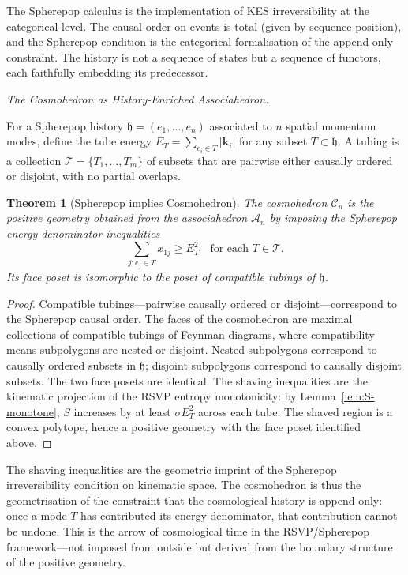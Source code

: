 \documentclass[12pt, oneside]{amsart}
\theoremstyle{plain}
\newtheorem{theorem}{Theorem}[section]
\theoremstyle{definition}
\theoremstyle{remark}
\newcommand{\Sf}{S}
\newcommand{\hist}{\mathfrak{h}}
\newcommand{\Assoc}{\mathcal{A}_n}
\newcommand{\Cosmo}{\mathcal{C}_n}
\begin{document}
The Spherepop calculus is the implementation of KES irreversibility at the categorical level. The causal order on events is total (given by sequence position), and the Spherepop condition is the categorical formalisation of the append-only constraint. The history is not a sequence of states but a sequence of functors, each faithfully embedding its predecessor.

\medskip\noindent\textit{The Cosmohedron as History-Enriched Associahedron.}

For a Spherepop history $\hist = (e_1, \ldots, e_n)$ associated to $n$ spatial momentum modes, define the tube energy $E_T = \sum_{e_i \in T} |\mathbf{k}_i|$ for any subset $T \subset \hist$. A tubing is a collection $\mathcal{T} = \{T_1, \ldots, T_m\}$ of subsets that are pairwise either causally ordered or disjoint, with no partial overlaps.

\begin{theorem}[Spherepop implies Cosmohedron]
\label{thm:cosmo}
The cosmohedron $\Cosmo$ is the positive geometry obtained from the associahedron $\Assoc$ by imposing the Spherepop energy denominator inequalities
\[
  \sum_{j: e_j \in T} x_{1j} \geq E_T^2 \quad \text{for each } T \in \mathcal{T}.
\]
Its face poset is isomorphic to the poset of compatible tubings of $\hist$.
\end{theorem}

\begin{proof}
Compatible tubings---pairwise causally ordered or disjoint---correspond to the Spherepop causal order. The faces of the cosmohedron are maximal collections of compatible tubings of Feynman diagrams, where compatibility means subpolygons are nested or disjoint. Nested subpolygons correspond to causally ordered subsets in $\hist$; disjoint subpolygons correspond to causally disjoint subsets. The two face posets are identical. The shaving inequalities are the kinematic projection of the RSVP entropy monotonicity: by Lemma~\ref{lem:S-monotone}, $\Sf$ increases by at least $\sigma E_T^2$ across each tube. The shaved region is a convex polytope, hence a positive geometry with the face poset identified above.
\end{proof}

The shaving inequalities are the geometric imprint of the Spherepop irreversibility condition on kinematic space. The cosmohedron is thus the geometrisation of the constraint that the cosmological history is append-only: once a mode $T$ has contributed its energy denominator, that contribution cannot be undone. This is the arrow of cosmological time in the RSVP/Spherepop framework---not imposed from outside but derived from the boundary structure of the positive geometry.
\end{document}
